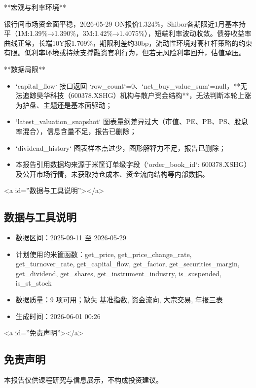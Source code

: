 \documentclass[12pt,a4paper]{article}
\begin{document}
**宏观与利率环境**

银行间市场资金面平稳，2026-05-29 ON报价1.324\%，Shibor各期限近1月基本持平（1M:1.39\%→1.390\%，3M:1.42\%→1.4075\%），短端利率波动收敛。债券收益率曲线正常，长端10Y报1.709\%，期限利差约30bp，流动性环境对高杠杆策略的约束有限。低利率环境或持续支撑融资套利行为，但若无风险利率回升，估值承压。

**数据局限**

\begin{itemize}
\item `capital\_flow` 接口返回 `row\_count`=0、`net\_buy\_value\_sum`=null，**无法追踪昊华科技（600378.XSHG）机构与散户资金结构**，无法判断本轮上涨为护盘、主题还是基本面驱动；
\item `latest\_valuation\_snapshot` 图表量纲差异过大（市值、PE、PB、PS、股息率混合），信息含量不足，报告已删除；
\item `dividend\_history` 图表样本点过少，图形解释力不足，报告已删除；
\item 本报告引用数据均来源于米筐订单级字段（`order\_book\_id`: 600378.XSHG）及公开市场行情，未获取持仓成本、资金流向结构等内部数据。
\end{itemize}

<a id=''数据与工具说明''></a>

\subsection{ 数据与工具说明}
\begin{itemize}
\item 数据区间：2025-09-11 至 2026-05-29
\item 计划使用的米筐函数：get\_price, get\_price\_change\_rate, get\_turnover\_rate, get\_capital\_flow, get\_factor, get\_securities\_margin, get\_dividend, get\_shares, get\_instrument\_industry, is\_suspended, is\_st\_stock
\item 数据质量：9 项可用；缺失 基准指数, 资金流向, 大宗交易, 年报三表
\item 生成时间：2026-06-01 00:26
\end{itemize}

<a id=''免责声明''></a>

\subsection{ 免责声明}
本报告仅供课程研究与信息展示，不构成投资建议。
\end{document}
